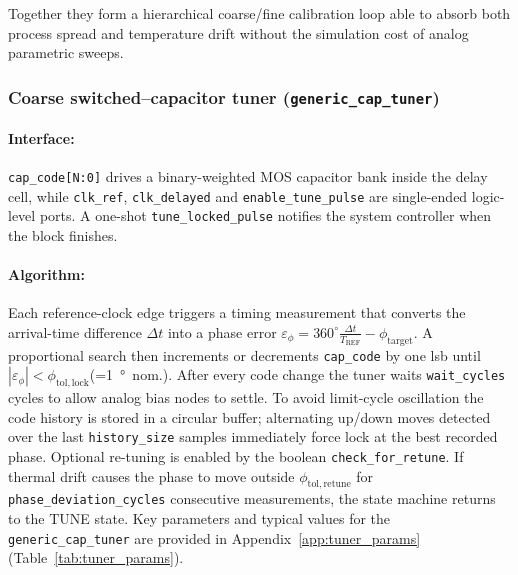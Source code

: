 Together they form a hierarchical coarse/fine calibration loop able to absorb both process spread and temperature drift without the simulation cost of analog parametric sweeps.

\subsubsection{Coarse switched–capacitor tuner (\texttt{generic\_cap\_tuner})}
\paragraph{Interface:}

\texttt{cap\_code[N{:}0]} drives a binary-weighted MOS capacitor bank inside the delay cell,
while \texttt{clk\_ref}, \texttt{clk\_delayed} and \texttt{enable\_tune\_pulse} are single-ended logic-level ports.
A one-shot \texttt{tune\_locked\_pulse} notifies the system controller when the block finishes.

\paragraph{Algorithm:}

Each reference-clock edge triggers a timing measurement that converts the arrival-time difference
\(\Delta t\) into a phase error
\(\varepsilon_\phi = 360^\circ \tfrac{\Delta t}{T_{\mathrm{REF}}}-\phi_\mathrm{target}\).
A proportional search then increments or decrements \texttt{cap\_code} by one \gls{lsb}
until \(|\varepsilon_\phi|<\phi_\mathrm{tol,lock}\)\;(=\SI{1}{\degree}~nom.).
After every code change the tuner waits \texttt{wait\_cycles} cycles to allow analog
 bias nodes to settle.
To avoid limit-cycle oscillation the code history is stored in a circular buffer; alternating up/down moves
detected over the last \texttt{history\_size} samples immediately force lock at the best recorded phase.
Optional re-tuning is enabled by the boolean \texttt{check\_for\_retune}.
If thermal drift causes the phase to move outside \(\phi_\mathrm{tol,retune}\) for
\texttt{phase\_deviation\_cycles} consecutive measurements, the state machine returns to the TUNE state.
Key parameters and typical values for the \texttt{generic\_cap\_tuner} are provided in Appendix~\ref{app:tuner_params} (Table~\ref{tab:tuner_params}).


